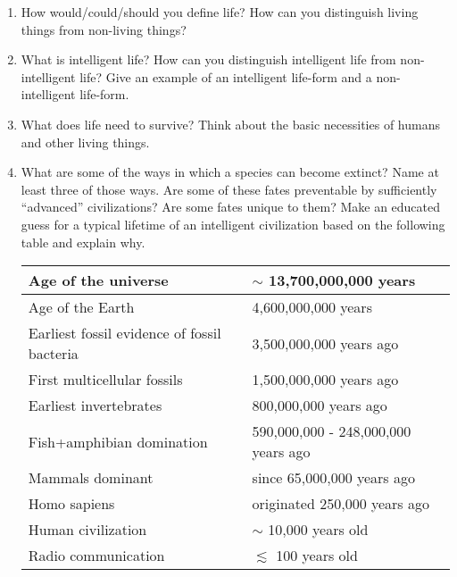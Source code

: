\documentclass[12pt]{article}%
\begin{document}
\begin{enumerate}

\item How would/could/should you define life?  
How can you distinguish living things from non-living things?

\item  What is intelligent life?  
How can you distinguish intelligent life from non-intelligent life?  
Give an example of an intelligent life-form and a non-intelligent life-form. 

\item  What does life need to survive?  
Think about the basic necessities of humans and other living things.

\item What are some of the ways in which a species can become extinct?  Name at least three of those ways.  
Are some of these fates preventable by sufficiently ``advanced'' civilizations?  Are some fates unique to them?  
Make an educated guess for a typical lifetime of an intelligent civilization based on the following table and explain why.
\\

\begin{center}
\begin{tabular}{|l|l|}
\hline
    Age of the universe & $\sim$ 13,700,000,000 years \\ \hline
    Age of the Earth & 4,600,000,000 years \\ \hline
    Earliest fossil evidence of fossil bacteria & 3,500,000,000 years ago \\ \hline
    First multicellular fossils & 1,500,000,000 years ago \\ \hline
    Earliest invertebrates & 800,000,000 years ago \\ \hline
    Fish+amphibian domination & 590,000,000 - 248,000,000 years ago \\ \hline
    Mammals dominant & since 65,000,000 years ago \\ \hline
    Homo sapiens & originated 250,000 years ago \\ \hline
    Human civilization & $\sim$ 10,000 years old \\ \hline
    Radio communication & $\lesssim$ 100 years old \\ \hline
\end{tabular}
\end{center}

\end{enumerate}
\end{document}
